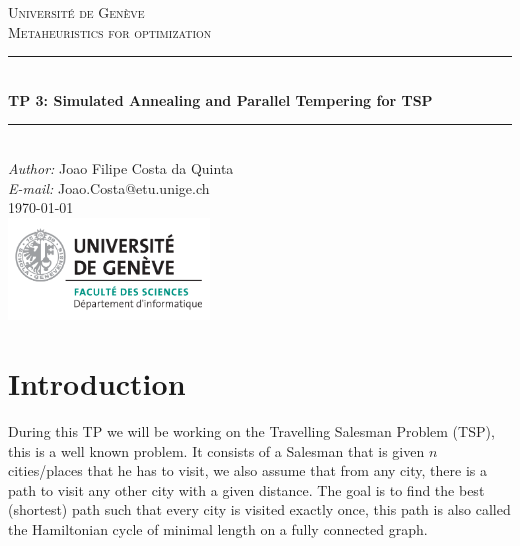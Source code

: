 \documentclass[a4paper]{article}
\makeatletter
\newcommand\TPid{3}
\newcommand\TPname{Simulated Annealing and Parallel Tempering for TSP}
\newcommand\Firstname{Joao Filipe}
\newcommand\Familyname{Costa da Quinta}
\newcommand\Email{Joao.Costa@etu.unige.ch}
\makeatother
\begin{document}
\begin{titlepage}

\newcommand{\HRule}{\rule{\linewidth}{0.5mm}} 							%

\center 
 
\textsc{\LARGE Université de Genève}\\[1cm]

\textsc{\Large Metaheuristics for optimization}\\[0.2cm]									%
\HRule \\[0.8cm]
{ \huge \bfseries TP \TPid : \TPname}\\[0.7cm]								%
\HRule \\[2cm]
\large
\emph{Author:} \Firstname \; \Familyname\\[0.5cm]		
\emph{E-mail:} {\color{blue}\Email}\\[7cm]		
{\large \today}\\[2cm]
\includegraphics[width=0.4\textwidth]{images/unige_csd.png}\\[1cm] 	%
\vfill 
\end{titlepage}


\newpage
\section{Introduction}
During this TP we will be working on the Travelling Salesman Problem (TSP), this is a well known problem. It consists of a Salesman that is given $n$ cities/places that he has to visit, we also assume that from any city, there is a path to visit any other city with a given distance. The goal is to find the best (shortest) path such that every city is visited exactly once, this path is also called the Hamiltonian cycle of minimal length on a fully connected graph.
\end{document}
